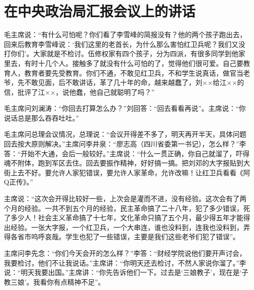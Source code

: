 \section[在中央政治局汇报会议上的讲话（一九六六年十月二十四日）]{在中央政治局汇报会议上的讲话}


毛主席说：“有什么可怕呢？你们看了李雪峰的简报没有？他的两个孩子跑出去，回来后教育李雪峰说：‘我们这里的老首长，为什么那么害怕红卫兵呢？我们又没打你们’。大家就是不检讨。伍修权家有四个孩子，分为四派，有很多同学到他家里去，有时十几个人。接触多了就没有什么可怕的了，觉得他们很可爱。自己要教育人，教育者要先受教育。你们不通，不敢见红卫兵，不和学生说真话，做官当老爷，先不敢见面，后不敢讲话，革了几十年的命，越来越蠢了，刘××给江××的信，批评了江××，说他蠢，他自己就聪明了吗？”

毛主席问刘澜涛：“你回去打算怎么办？”刘回答：“回去看看再说”。主席说：“你说话总是那么吞吞吐吐。”

毛主席问总理会议情况，总理说：“会议开得差不多了，明天再开半天，具体问题回去按大原则解决。”主席问李井泉：“廖志高（四川省委第一书记），怎么样？”李答：“开始不大通，会后一般较好。”主席说：“什么一贯正确，你自己就溜了，吓得魂不附体，跑到军区去住。回去要振作精神，好好搞一搞。把刘邓的大字报贴到大街上去不好。要允许人家犯错误，要允许人家革命，允许改嘛！让红卫兵看看《阿Q正传》。”

主席说：“这次会开得比较好一些，上次会是灌而不进，没有经验。这次会有了两个月的经验。一共不到五个月的经验，民主革命搞了二十八年，犯了多少错误，死了多少人！社会主义革命搞了十七年，文化革命只搞了五个月，最少得五年才能得出经验。一张大字报，一个红卫兵，一个大串连，谁也没料到，连我也没料到，弄得各省市呜呼哀哉。学生也犯了一些错误，主要是我们这些老爷们犯了错误”。

主席问李先念：“你们今天会开的怎么样？”李答：“财经学院说他们要开声讨会，我要检讨，他们不让我说话。”主席讲：“你明天还去检讨，不然人家说你溜了。”李说：“明天我要出国。”主席讲：“你先告诉他们一下。过去是‘三娘教子’，现在是‘子教三娘’。我看你有点精神不足”。

